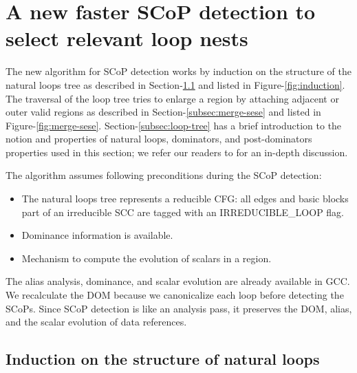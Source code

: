 \documentclass{sigplanconf}
\begin{document}
\section{A new faster SCoP detection to select relevant loop nests}
\label{sec:new-SCoP-detection}
The new algorithm for SCoP detection works by induction on the structure of the
natural loops tree as described in Section-\ref{subsec:induction} and listed in
Figure-\ref{fig:induction}.  The traversal of the loop tree tries to enlarge a
region by attaching adjacent or outer valid regions as described in
Section-\ref{subsec:merge-sese} and listed in Figure-\ref{fig:merge-sese}.
Section-\ref{subsec:loop-tree} has a brief introduction to the notion and
properties of natural loops, dominators, and post-dominators properties used in
this section; we refer our readers to \cite{ramalingam} for an in-depth
discussion.

The algorithm assumes following preconditions during the SCoP detection:
\begin{itemize}
\item The natural loops tree represents a reducible CFG: all edges and basic
  blocks part of an irreducible SCC are tagged with an IRREDUCIBLE\_LOOP flag.

\item Dominance information is available.
\item Mechanism to compute the evolution of scalars in a region.
\end{itemize}

The alias analysis, dominance, and scalar evolution are already available in
GCC.  We recalculate the DOM because we canonicalize each loop before detecting
the SCoPs.  Since SCoP detection is like an analysis pass, it preserves the DOM,
alias, and the scalar evolution of data references.

\subsection{Induction on the structure of natural loops}
\label{subsec:induction}
\end{document}
